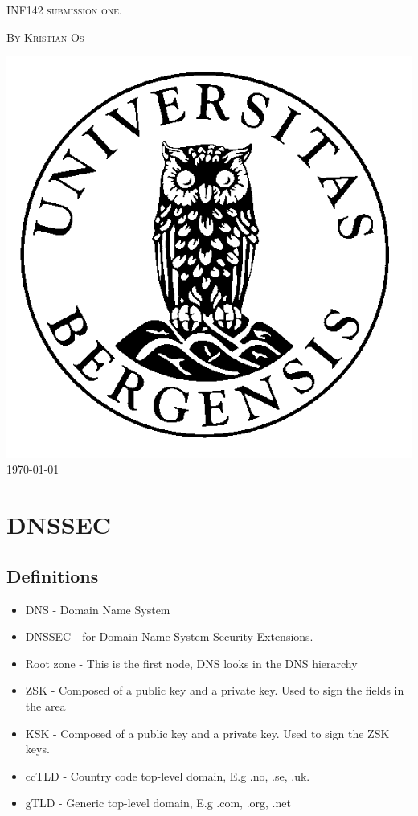 \documentclass{article}
\begin{document}
	\begin{titlepage}
		\centering
		{\scshape\Large INF142 submission one.\par}
		\vspace{3em}
		{{\scshape\large By Kristian Os \par}}
        \vspace{5em}
        \includegraphics[scale=0.5]{uibLogo}
		\vfill
		\large\today
	\end{titlepage}
	\pagebreak
	\section{DNSSEC}
		\subsection{Definitions}
        \begin{itemize}
            \item DNS - Domain Name System
            \item DNSSEC - for Domain Name System Security Extensions.
            \item Root zone - This is the first node, DNS looks in the DNS hierarchy
            \item ZSK - Composed of a public key and a private key. Used to sign the fields in the area\cite{ovh}
            \item KSK - Composed of a public key and a private key. Used to sign the ZSK keys.\cite{ovh}
			\item ccTLD - Country code top-level domain, E.g .no, .se, .uk. 
            \item gTLD - Generic top-level domain, E.g .com, .org, .net
        \end{itemize}
\end{document}
